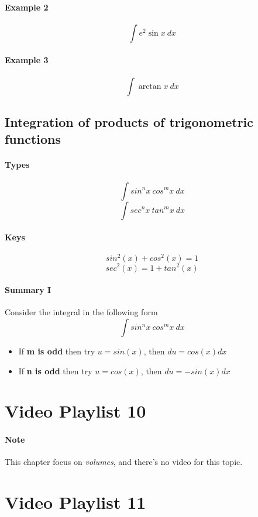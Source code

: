 \documentclass{article}
\begin{document}
	\paragraph{Example 2}
	\[
		\int{e^2 \sin{x}\ dx}
	\]
	
	\paragraph{Example 3}
	\[
		\int{\arctan{x}\ dx}
	\]
	
	\subsection{Integration of products of trigonometric functions}
	\paragraph{Types}
	\[
		\int {sin^n x\ cos^m x \ dx}
	\]
	\[
		\int {sec^n x\ tan^m x \ dx}
	\]
	\paragraph{Keys}
	\[
		sin^2(x) + cos^2(x) = 1
	\]
	\[
		sec^2(x) = 1 + tan^2(x)
	\]
	\paragraph{Summary I}
	Consider the integral in the following form
	\[
		\int {sin^n x\ cos^m x \ dx}
	\]
	\begin{itemize}
		\item If \textbf{m is odd} then try $u = sin(x)$, then $du = cos(x)dx$
		\item If \textbf{n is odd} then try $u = cos(x)$, then $du = -sin(x)dx$
	\end{itemize}

\section{Video Playlist 10}
	\paragraph{Note} This chapter focus on \emph{volumes}, and there's no video for this topic.

\section{Video Playlist 11}
\end{document}
